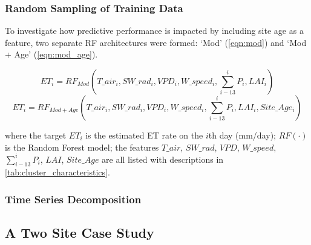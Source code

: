 \subsubsection{Random Sampling of Training Data}
To investigate how predictive performance is impacted by including site age as a feature, two separate RF architectures were formed: `Mod' (\autoref{eqn:mod}) and `Mod + Age' (\autoref{eqn:mod_age}).


\begin{equation}
	ET_i = RF_{Mod}(T\_air_i, SW\_rad_i, VPD_i, W\_speed_i, \sum_{i - 13}^{i}P_i, LAI_i)
	\label{eqn:mod}
\end{equation}
\vspace{-0.75em}
\begin{equation}
	ET_i = RF_{Mod + Age}(T\_air_i, SW\_rad_i, VPD_i, W\_speed_i, \sum_{i - 13}^{i}P_i, LAI_i, Site\_Age_i)
	\label{eqn:mod_age}
\end{equation}

where the target $ET_i$ is the estimated ET rate on the $i$th day (mm/day); $RF(\cdot)$ is the Random Forest model; the features $T\_air$, $SW\_rad$, $VPD$, $W\_speed$, $\sum_{i - 13}^{i}P_i$, $LAI$, $Site\_Age$ are all listed with descriptions in \autoref{tab:cluster_characteristics}.



\subsubsection{Time Series Decomposition}





\subsection{A Two Site Case Study}